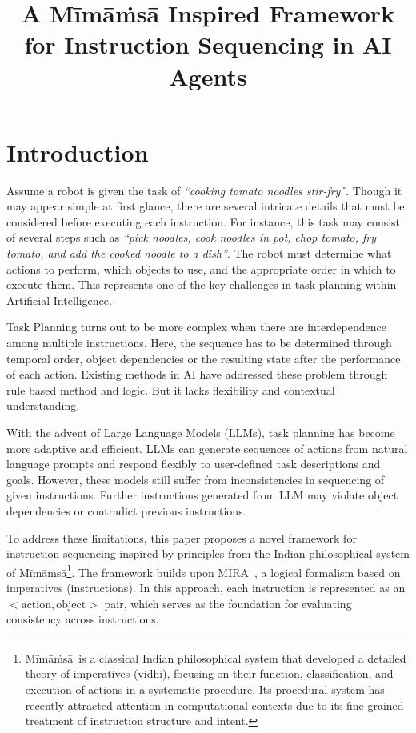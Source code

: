 \documentclass[a4paper,11pt]{lmcs}
\title{A M\={i}m\={a}\.{m}s\={a} Inspired Framework for Instruction Sequencing in AI Agents}
\author{}
\newcommand{\mimamsa}{M\={i}m\={a}\.ms\={a}}
\begin{document}
\maketitle

\begin{abstract}

\end{abstract}

\section{Introduction}
Assume a robot is given the task of \textit{``cooking tomato noodles stir-fry''}. Though it may appear simple at first glance, there are several intricate details that must be considered before executing each instruction. For instance, this task may consist of several steps such as \textit{``pick noodles, cook noodles in pot, chop tomato, fry tomato, and add the cooked noodle to a dish''}. The robot must determine what actions to perform, which objects to use, and the appropriate order in which to execute them. This represents one of the key challenges in task planning within Artificial Intelligence.

Task Planning turns out to be more complex when there are interdependence among multiple instructions. Here, the sequence has to be determined through temporal order, object dependencies or the resulting state after the performance of each action. Existing methods in AI have addressed these problem through rule based method and logic. But it lacks flexibility and contextual understanding.

With the advent of Large Language Models (LLMs), task planning has become more adaptive and efficient. LLMs can generate sequences of actions from natural language prompts and respond flexibly to user-defined task descriptions and goals. However, these models still suffer from inconsistencies in sequencing of given instructions. Further instructions generated from LLM may violate object dependencies or contradict previous instructions.

To address these limitations, this paper proposes a novel framework for instruction sequencing inspired by principles from the Indian philosophical system of \mimamsa\footnote{\mimamsa~is a classical Indian philosophical system that developed a detailed theory of imperatives (vidhi), focusing on their function, classification, and execution of actions in a systematic procedure. Its procedural system has recently attracted attention in computational contexts due to its fine-grained treatment of instruction structure and intent.}. The framework builds upon MIRA~\cite{mira}, a logical formalism based on imperatives (instructions). In this approach, each instruction is represented as an $<\text{action}, \text{object}>$ pair, which serves as the foundation for evaluating consistency across instructions.
\end{document}
